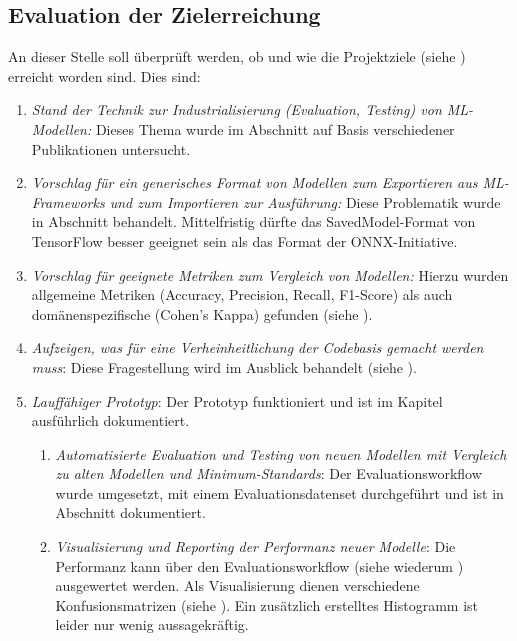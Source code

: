 \clearpage

\subsection{Evaluation der Zielerreichung}
\label{sec:evaluation-der-zielerreichung}

An dieser Stelle soll überprüft werden, ob und wie die Projektziele (siehe ) erreicht worden sind. Dies sind:

\begin{enumerate}
    \item \textit{Stand der Technik zur Industrialisierung (Evaluation, Testing) von ML-Modellen:} Dieses Thema wurde im Abschnitt  auf Basis verschiedener Publikationen untersucht.
    \item \textit{Vorschlag für ein generisches Format von Modellen zum Exportieren aus ML-Frameworks und zum Importieren zur Ausführung:} Diese Problematik wurde in Abschnitt  behandelt. Mittelfristig dürfte das SavedModel-Format von TensorFlow besser geeignet sein als das Format der ONNX-Initiative.
    \item \textit{Vorschlag für geeignete Metriken zum Vergleich von Modellen:} Hierzu wurden allgemeine Metriken (Accuracy, Precision, Recall, F1-Score) als auch domänenspezifische (Cohen's Kappa) gefunden (siehe ).
    \item \textit{Aufzeigen, was für eine Verheinheitlichung der Codebasis gemacht werden muss}: Diese Fragestellung wird im Ausblick behandelt (siehe ).
    \item \textit{Lauffähiger Prototyp}: Der Prototyp funktioniert und ist im Kapitel  ausführlich dokumentiert.
    \begin{enumerate}
        \item \textit{Automatisierte Evaluation und Testing von neuen Modellen mit Vergleich zu alten Modellen und Minimum-Standards}: Der Evaluationsworkflow wurde umgesetzt, mit einem Evaluationsdatenset durchgeführt und ist in Abschnitt  dokumentiert.
        \item \textit{Visualisierung und Reporting der Performanz neuer Modelle}: Die Performanz kann über den Evaluationsworkflow (siehe wiederum ) ausgewertet werden. Als Visualisierung dienen verschiedene Konfusionsmatrizen (siehe ). Ein zusätzlich erstelltes Histogramm ist leider nur wenig aussagekräftig.

\end{enumerate}
\end{enumerate}
